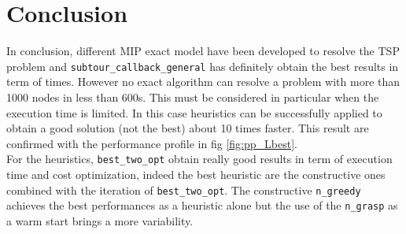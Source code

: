 \chapter{Conclusion}
In conclusion, different MIP exact model have been developed to resolve the TSP problem and \texttt{subtour\_callback\_general} has definitely obtain the best results in term of times. However no exact algorithm can resolve a problem with more than 1000 nodes in less than 600s. This must be considered in particular when the execution time is limited. In this case heuristics can be successfully applied to obtain a good solution (not the best) about 10 times faster. This result are confirmed with the performance profile in fig \ref{fig:pp_Lbest}.\\
For the heuristics, \texttt{best\_two\_opt} obtain really good results in term of execution time and cost optimization, indeed the best heuristic are the constructive ones combined with the iteration of \texttt{best\_two\_opt}.
The constructive \texttt{n\_greedy} achieves the best performances as a heuristic alone but the use of the \texttt{n\_grasp} as a warm start brings a more variability.
